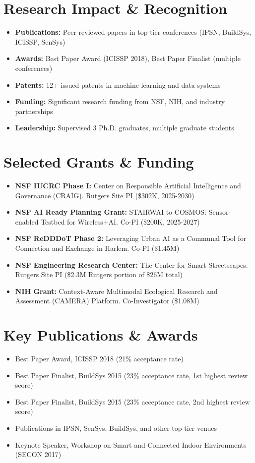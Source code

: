 \documentclass[11pt]{article}
\begin{document}
\section{Research Impact \& Recognition}
\begin{itemize}
    \item \textbf{Publications:} Peer-reviewed papers in top-tier conferences (IPSN, BuildSys, ICISSP, SenSys)
    \item \textbf{Awards:} Best Paper Award (ICISSP 2018), Best Paper Finalist (multiple conferences)
    \item \textbf{Patents:} 12+ issued patents in machine learning and data systems
    \item \textbf{Funding:} Significant research funding from NSF, NIH, and industry partnerships
    \item \textbf{Leadership:} Supervised 3 Ph.D. graduates, multiple graduate students
\end{itemize}

\section{Selected Grants \& Funding}
\begin{itemize}[topsep=1pt,itemsep=2pt]
    \item \textbf{NSF IUCRC Phase I:} Center on Responsible Artificial Intelligence and Governance (CRAIG). Rutgers Site PI (\$302K, 2025-2030)
    \item \textbf{NSF AI Ready Planning Grant:} STAIRWAI to COSMOS: Sensor-enabled Testbed for Wireless+AI. Co-PI (\$200K, 2025-2027)
    \item \textbf{NSF ReDDDoT Phase 2:} Leveraging Urban AI as a Communal Tool for Connection and Exchange in Harlem. Co-PI (\$1.45M)
    \item \textbf{NSF Engineering Research Center:} The Center for Smart Streetscapes. Rutgers Site PI (\$2.3M Rutgers portion of \$26M total)
    \item \textbf{NIH Grant:} Context-Aware Multimodal Ecological Research and Assessment (CAMERA) Platform. Co-Investigator (\$1.08M)
\end{itemize}

\section{Key Publications \& Awards}
\begin{itemize}[topsep=1pt,itemsep=2pt]
    \item Best Paper Award, ICISSP 2018 (21\% acceptance rate)
    \item Best Paper Finalist, BuildSys 2015 (23\% acceptance rate, 1st highest review score)
    \item Best Paper Finalist, BuildSys 2015 (23\% acceptance rate, 2nd highest review score)
    \item Publications in IPSN, SenSys, BuildSys, and other top-tier venues
    \item Keynote Speaker, Workshop on Smart and Connected Indoor Environments (SECON 2017)
\end{itemize}
\end{document}
